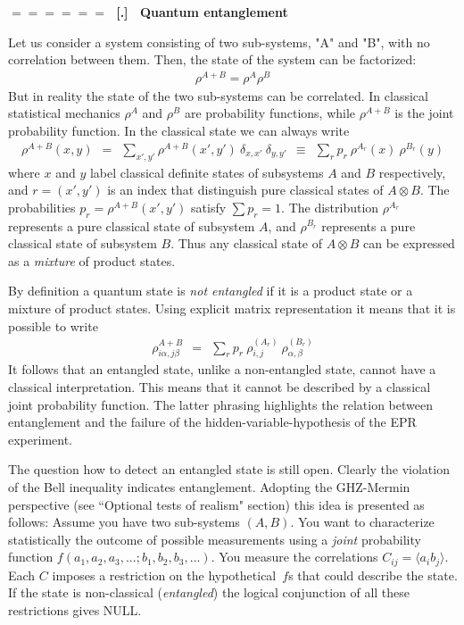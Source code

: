 \documentclass[onecolumn,fleqn]{revtex4}
\newcommand{\beq}{\begin{eqnarray}}
\newcommand{\eeq}{\end{eqnarray}}
\renewcommand{\thesubsection}{\arabic{subsection}}
\renewcommand{\thesubsubsection}{\arabic{subsubsection}}
\newcommand{\sheadC}[1]
{
\addtocounter{subsubsection}{1}
\vspace{5mm}
{\Large\bf $=\!=\!=\!=\!=\!=\;$ [\thesubsection.\thesubsubsection] \ #1}  
\nopagebreak
\phantomsection
}
\begin{document}
\sheadC{Quantum entanglement}


Let us consider a system consisting of two sub-systems, 
"A" and "B", with no correlation between them. 
Then, the state of the system can be factorized: 
\beq
\rho^{A+B} = \rho^{A}\rho^{B} 
\eeq
But in reality the state of the two sub-systems 
can be correlated. In classical statistical 
mechanics  $\rho^{A}$ and $\rho^{B}$ are 
probability functions, while $\rho^{A+B}$ is the joint 
probability function. In the classical state 
we can always write 
\beq
\rho^{A+B}(x,y) 
\ \ = \ \ 
\sum_{x',y'} \rho^{A+B}(x',y') \ \delta_{x,x'} \ \delta_{y,y'} 
\ \ \equiv \ \ 
\sum_r p_r \ \rho^{A_r}(x) \ \rho^{B_r}(y) 
\eeq
where $x$ and $y$ label classical definite states 
of subsystems $A$ and $B$ respectively, 
and $r=(x',y')$ is an index that distinguish pure classical 
states of $A \otimes B$. 
The probabilities $p_r=\rho^{A+B}(x',y')$ satisfy $\sum p_r=1$. 
The distribution $\rho^{A_r}$ represents a pure classical state of subsystem $A$, 
and $\rho^{B_r}$ represents a pure classical state of subsystem $B$.
Thus any classical state of $A \otimes B$ can be expressed 
as a {\em mixture} of product states. 

By definition a quantum state is {\em not entangled} 
if it is a product state or a mixture of product states.
Using explicit matrix representation it means that 
it is possible to write 
\beq
\rho_{i\alpha,j\beta}^{A+B} \ \ = \ \ 
\sum_{r} p_{r} \ \rho_{i,j}^{(A_r)} \ \rho_{\alpha,\beta}^{(B_r)} 
\eeq
It follows that an entangled state, unlike a non-entangled state, cannot have a classical interpretation. 
This means that it cannot be described by a classical joint probability function. 
The latter phrasing highlights the relation between entanglement and 
the failure of the hidden-variable-hypothesis of the EPR experiment. 

The question how to detect an entangled state is still open.
Clearly the violation of the Bell inequality indicates entanglement.
Adopting the GHZ-Mermin perspective (see ``Optional tests of realism" section)   
this idea is presented as follows: Assume you have two sub-systems $(A,B)$.
You want to characterize statistically the outcome of 
possible measurements using a {\em joint} probability function ${f(a_1,a_2,a_3,...;b_1,b_2,b_3,...)}$. 
You measure the correlations ${C_{ij} = \langle a_i b_j \rangle}$. 
Each $C$ imposes a restriction on the hypothetical~$f$s that could describe the state.
If the state is non-classical ({\em entangled})
the logical conjunction of all these restrictions gives NULL. 
\end{document}
